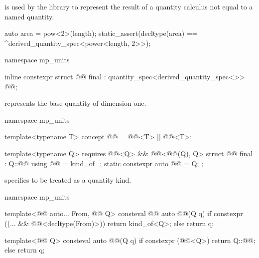\pnum
{} is used by the library
to represent the result of a quantity calculus not equal to a named quantity.
\begin{example}
\begin{codeblock}
auto area = pow<2>(length);
static_assert(decltype(area) == ^derived_quantity_spec<power<length, 2>>);
\end{codeblock}
\end{example}

\begin{codeblock}
namespace mp_units {

inline constexpr struct @@ final : quantity_spec<derived_quantity_spec<>> {
} @@;

}
\end{codeblock}

\pnum
{} represents the base quantity of dimension one.

\begin{codeblock}
namespace mp_units {

template<typename T>
concept @@ = @@<T> || @@<T>;

template<typename Q>
  requires @@<Q> && @@<@@(Q{}), Q{}>
struct @@ final : Q::@@ {
  using @@ = kind_of_;
  static constexpr auto @@ = Q{};
};

}
\end{codeblock}

\pnum
{} specifies  to be treated as a quantity kind.

\begin{codeblock}
namespace mp_units {

template<@@ auto... From, @@ Q>
consteval @@ auto @@(Q q)
{
  if constexpr ((... && @@<decltype(From)>))
    return kind_of<Q{}>;
  else
    return q;
}

template<@@ Q>
consteval auto @@(Q q)
{
  if constexpr (@@<Q>)
    return Q::@@;
  else
    return q;
}

}
\end{codeblock}

